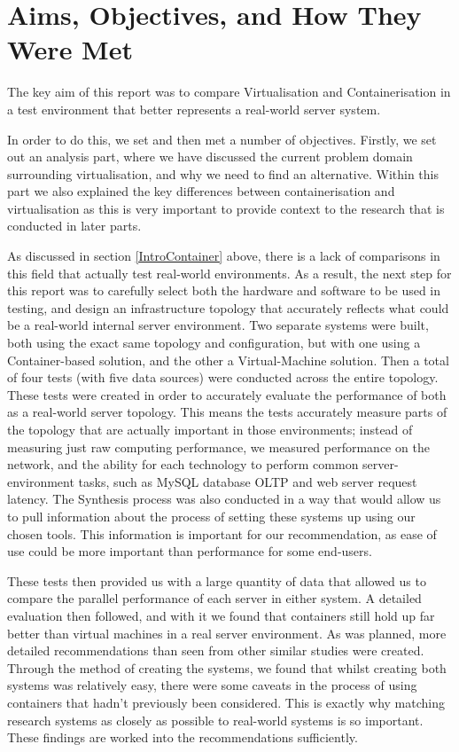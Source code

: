 \section{Aims, Objectives, and How They Were Met}
The key aim of this report was to compare Virtualisation and Containerisation in a test environment that better represents a real-world server system.

 In order to do this, we set and then met a number of objectives. Firstly, we set out an analysis part, where we have discussed the current problem domain surrounding virtualisation, and why we need to find an alternative. Within this part we also explained the key differences between containerisation and virtualisation as this is very important to provide context to the research that is conducted in later parts.

As discussed in section \ref{IntroContainer} above, there is a lack of comparisons in this field that actually test real-world environments. As a result, the next step for this report was to carefully select both the hardware and software to be used in testing, and design an infrastructure topology that accurately reflects what could be a real-world internal server environment. Two separate systems were built, both using the exact same topology and configuration, but with one using a Container-based solution, and the other a Virtual-Machine solution. Then a total of four tests (with five data sources) were conducted across the entire topology. These tests were created in order to accurately evaluate the performance of both as a real-world server topology. This means the tests accurately measure parts of the topology that are actually important in those environments; instead of measuring just raw computing performance, we measured performance on the network, and the ability for each technology to perform common server-environment tasks, such as MySQL database OLTP \citep{oltpbenchmarking} and web server request latency. The Synthesis process was also conducted in a way that would allow us to pull information about the process of setting these systems up using our chosen tools. This information is important for our recommendation, as ease of use could be more important than performance for some end-users.

These tests then provided us with a large quantity of data that allowed us to compare the parallel performance of each server in either system. A detailed evaluation then followed, and with it we found that containers still hold up far better than virtual machines in a real server environment. As was planned, more detailed recommendations than seen from other similar studies were created. Through the method of creating the systems, we found that whilst creating both systems was relatively easy, there were some caveats in the process of using containers that hadn't previously been considered. This is exactly why matching research systems as closely as possible to real-world systems is so important. These findings are worked into the recommendations sufficiently.

